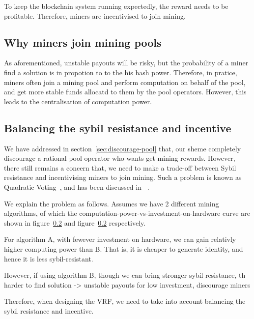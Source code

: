 To keep the blockchain system running expectedly, the reward needs to be profitable.
Therefore, miners are incentivised to join mining.

\subsection{Why miners join mining pools}

As aforementioned, unstable payouts will be risky, but the probability of a miner find a solution is in propotion to to the his hash power.
Therefore, in pratice, miners often join a mining pool and perform computation on behalf of the pool, and get more stable funds allocatd to them by the pool operators.
However, this leads to the centralisation of computation power.

\subsection{Balancing the sybil resistance and incentive}

We have addressed in section~\ref{sec:discourage-pool} that, our sheme completely discourage a rational pool operator who wants get mining rewards.
However, there still remains a concern that, we need to make a trade-off between Sybil resistance and incentivising miners to join mining.
Such a problem is known as Quadratic Voting~\cite{lalley2018quadratic}, and has been discussed in ~\cite{radical}.

We explain the problem as follows. Assumes we have 2 different mining algorithms, of which the computation-power-vs-investment-on-hardware curve are shown in figure~\ref{} and figure~\ref{} respectively.

For algorithm A, with fewever investment on hardware, we can gain relativly higher computing power than B. That is, it is cheaper to generate identity, and hence it is less sybil-resistant.

However, if using algorithm B, though we can bring stronger sybil-resistance, 
th
harder to find solution -> unstable payouts for low investment, 
discourage miners 





Therefore, when designing the VRF, we need to take into account balancing the sybil resistance and incentive.